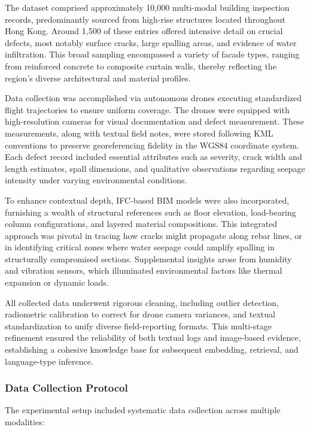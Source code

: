 The dataset comprised approximately 10,000 multi-modal building inspection records, predominantly sourced from high-rise structures located throughout Hong Kong. Around 1,500 of these entries offered intensive detail on crucial defects, most notably surface cracks, large spalling areas, and evidence of water infiltration. This broad sampling encompassed a variety of facade types, ranging from reinforced concrete to composite curtain walls, thereby reflecting the region's diverse architectural and material profiles.

Data collection was accomplished via autonomous drones executing standardized flight trajectories to ensure uniform coverage. The drones were equipped with high-resolution cameras for visual documentation and defect measurement. These measurements, along with textual field notes, were stored following KML conventions to preserve georeferencing fidelity in the WGS84 coordinate system. Each defect record included essential attributes such as severity, crack width and length estimates, spall dimensions, and qualitative observations regarding seepage intensity under varying environmental conditions.

To enhance contextual depth, IFC-based BIM models were also incorporated, furnishing a wealth of structural references such as floor elevation, load-bearing column configurations, and layered material compositions. This integrated approach was pivotal in tracing how cracks might propagate along rebar lines, or in identifying critical zones where water seepage could amplify spalling in structurally compromised sections. Supplemental insights arose from humidity and vibration sensors, which illuminated environmental factors like thermal expansion or dynamic loads.

All collected data underwent rigorous cleaning, including outlier detection, radiometric calibration to correct for drone camera variances, and textual standardization to unify diverse field-reporting formats. This multi-stage refinement ensured the reliability of both textual logs and image-based evidence, establishing a cohesive knowledge base for subsequent embedding, retrieval, and language-type inference.

\subsubsection{Data Collection Protocol}

The experimental setup included systematic data collection across multiple modalities:

